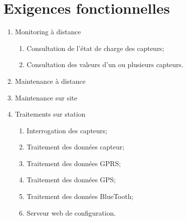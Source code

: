 
\section{Exigences fonctionnelles}

    \begin{enumerate}

    \renewcommand{\labelenumi}
            {FO n\degres \arabic{enumi}~:}
    \renewcommand{\labelenumii}
            {FO n\degres \arabic{enumi}.\arabic{enumii}~:}
    
        \item Monitoring à distance
            \begin{enumerate}
                \item Consultation de l'état de charge des capteurs;
                \item Consultation des valeurs d'un ou plusieurs
                         capteurs.
            \end{enumerate}

        \item Maintenance à distance
        
        \item Maintenance sur site

        \item Traitements sur station
            \begin{enumerate}
                \item Interrogation des capteurs;
                \item Traitement des données capteur;
                \item Traitement des données GPRS;
                \item Traitement des données GPS;
                \item Traitement des données BlueTooth;
                \item Serveur web de configuration.
            \end{enumerate}
    \end{enumerate}


